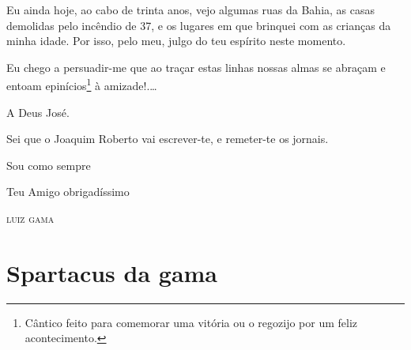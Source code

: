Eu ainda hoje, ao cabo de trinta anos, vejo algumas ruas da Bahia, as
casas demolidas pelo incêndio de 37, e os lugares em que brinquei com as
crianças da minha idade. Por isso, pelo meu, julgo do teu espírito neste
momento.

Eu chego a persuadir-me que ao traçar estas linhas nossas almas se
abraçam e entoam epinícios\footnote{ Cântico feito para comemorar uma
  vitória ou o regozijo por um feliz acontecimento.} à amizade!.\ldots{}

A Deus José.

Sei que o Joaquim Roberto vai escrever-te, e remeter-te os jornais.

\begin{flushright}
Sou como sempre

Teu Amigo obrigadíssimo

\textsc{luiz gama}
\end{flushright}

\part{Spartacus da gama}

